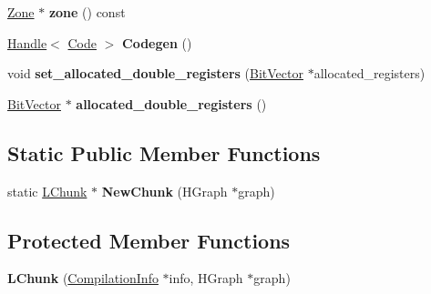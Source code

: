 \begin{DoxyCompactItemize}
\item 
\hypertarget{classv8_1_1internal_1_1_l_chunk_a06b554199ad9b7d54036e5079fff6d94}{}\hyperlink{classv8_1_1internal_1_1_zone}{Zone} $\ast$ {\bfseries zone} () const \label{classv8_1_1internal_1_1_l_chunk_a06b554199ad9b7d54036e5079fff6d94}

\item 
\hypertarget{classv8_1_1internal_1_1_l_chunk_a5f0cd642edcb086e6db8d4c84ded744a}{}\hyperlink{classv8_1_1internal_1_1_handle}{Handle}$<$ \hyperlink{classv8_1_1internal_1_1_code}{Code} $>$ {\bfseries Codegen} ()\label{classv8_1_1internal_1_1_l_chunk_a5f0cd642edcb086e6db8d4c84ded744a}

\item 
\hypertarget{classv8_1_1internal_1_1_l_chunk_a2299aec2d106b0c882670f5191df4404}{}void {\bfseries set\+\_\+allocated\+\_\+double\+\_\+registers} (\hyperlink{classv8_1_1internal_1_1_bit_vector}{Bit\+Vector} $\ast$allocated\+\_\+registers)\label{classv8_1_1internal_1_1_l_chunk_a2299aec2d106b0c882670f5191df4404}

\item 
\hypertarget{classv8_1_1internal_1_1_l_chunk_a31588083d702b377696de3ac69e92243}{}\hyperlink{classv8_1_1internal_1_1_bit_vector}{Bit\+Vector} $\ast$ {\bfseries allocated\+\_\+double\+\_\+registers} ()\label{classv8_1_1internal_1_1_l_chunk_a31588083d702b377696de3ac69e92243}

\end{DoxyCompactItemize}
\subsection*{Static Public Member Functions}
\begin{DoxyCompactItemize}
\item 
\hypertarget{classv8_1_1internal_1_1_l_chunk_a9a16a3f430aa2fd25bb966e5160ba642}{}static \hyperlink{classv8_1_1internal_1_1_l_chunk}{L\+Chunk} $\ast$ {\bfseries New\+Chunk} (H\+Graph $\ast$graph)\label{classv8_1_1internal_1_1_l_chunk_a9a16a3f430aa2fd25bb966e5160ba642}

\end{DoxyCompactItemize}
\subsection*{Protected Member Functions}
\begin{DoxyCompactItemize}
\item 
\hypertarget{classv8_1_1internal_1_1_l_chunk_a17a1b6d45a4c45eaa15a1e8f154690df}{}{\bfseries L\+Chunk} (\hyperlink{classv8_1_1internal_1_1_compilation_info}{Compilation\+Info} $\ast$info, H\+Graph $\ast$graph)\label{classv8_1_1internal_1_1_l_chunk_a17a1b6d45a4c45eaa15a1e8f154690df}

\end{DoxyCompactItemize}
